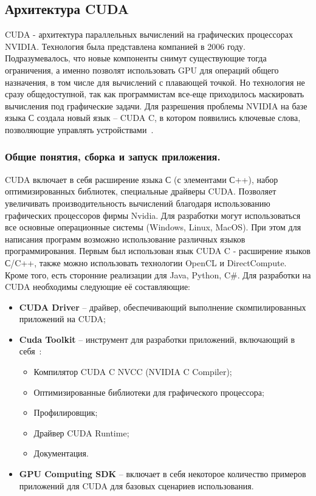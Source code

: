 \subsection{Архитектура CUDA}
\label{CUDA:section}
CUDA - архитектура параллельных вычислений на графических процессорах NVIDIA. Технология была представлена компанией в 2006 году. Подразумевалось, что новые компоненты снимут существующие тогда ограничения, а именно позволят использовать GPU для операций общего назначения, в том числе для вычислений с плавающей точкой. Но технология не сразу общедоступной, так как программистам все-еще приходилось маскировать вычисления под графические задачи. Для разрешения проблемы NVIDIA на базе языка С создала новый язык -- CUDA C, в котором появились ключевые слова, позволяющие управлять устройствами~\cite{KandrotSanders2022}.

\subsubsection*{Общие понятия, сборка и запуск приложения.} 
CUDA включает в себя расширение языка С (с элементами С++), набор оптимизированных библиотек, специальные драйверы CUDA. Позволяет увеличивать производительность вычислений благодаря использованию графических процессоров фирмы Nvidia.
Для разработки могут использоваться все основные операционные системы (Windows, Linux, MacOS).
При этом для написания программ возможно использование различных языков программирования. Первым был использован язык CUDA C - расширение языков С/C++, также можно использовать технологии OpenCL и DirectCompute. Кроме того, есть сторонние реализации для Java, Python, C\#.
Для разработки на CUDA необходимы следующие её составляющие:
\begin{itemize}
    \item\textbf{CUDA Driver} -- драйвер, обеспечивающий выполнение скомпилированных приложений на CUDA;
    \item\textbf{Cuda Toolkit} -- инструмент для разработки приложений, включающий в себя~\cite{Gergel2016}:
    \begin{itemize}
        \item Компилятор CUDA C NVCC (NVIDIA C Compiler);
        \item Оптимизированные библиотеки для графического процессора;
        \item Профилировщик;
        \item Драйвер CUDA Runtime;
        \item Документация.
    \end{itemize}
    \item\textbf{GPU Computing SDK} -- включает в себя некоторое количество примеров приложений для CUDA для базовых сценариев использования.
\end{itemize}

